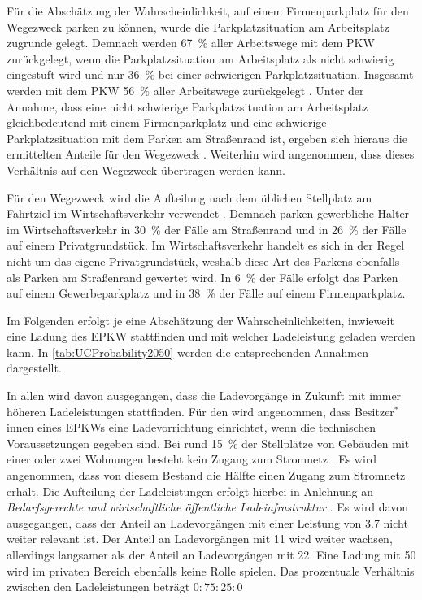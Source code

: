 Für die Abschätzung der Wahrscheinlichkeit, auf einem Firmenparkplatz für den Wegezweck \Arbeit parken zu können, wurde die Parkplatzsituation am Arbeitsplatz zugrunde gelegt.
Demnach werden \SI{67}{\percent} aller Arbeitswege mit dem \gls{PKW} zurückgelegt, wenn die Parkplatzsituation am Arbeitsplatz als nicht schwierig eingestuft wird und nur \SI{36}{\percent} bei einer schwierigen Parkplatzsituation.
Insgesamt werden mit dem \gls{PKW} \SI{56}{\percent} aller Arbeitswege zurückgelegt \cite{Ecke2020}.
Unter der Annahme, dass eine nicht schwierige Parkplatzsituation am Arbeitsplatz gleichbedeutend mit einem Firmenparkplatz und eine schwierige Parkplatzsituation mit dem Parken am Straßenrand ist, ergeben sich hieraus die ermittelten Anteile für den Wegezweck \Arbeitdot.
Weiterhin wird angenommen, dass dieses Verhältnis auf den Wegezweck \Ausbildung übertragen werden kann.\medskip

Für den Wegezweck \dienst wird die Aufteilung nach dem üblichen Stellplatz am Fahrtziel im Wirtschaftsverkehr verwendet \cite{Rikus2015}.
Demnach parken gewerbliche Halter im Wirtschaftsverkehr in \SI{30}{\percent} der Fälle am Straßenrand und in \SI{26}{\percent} der Fälle auf einem Privatgrundstück.
Im Wirtschaftsverkehr handelt es sich in der Regel nicht um das eigene Privatgrundstück, weshalb diese Art des Parkens ebenfalls als Parken am Straßenrand gewertet wird.
In \SI{6}{\percent} der Fälle erfolgt das Parken auf einem Gewerbeparkplatz und in \SI{38}{\percent} der Fälle auf einem Firmenparkplatz.\medskip

Im Folgenden erfolgt je \UC eine Abschätzung der Wahrscheinlichkeiten, inwieweit eine Ladung des \gls{EPKW} stattfinden und mit welcher Ladeleistung geladen werden kann.
In \autoref{tab:UCProbability2050} werden die entsprechenden Annahmen dargestellt.



In allen \UCs wird davon ausgegangen, dass die Ladevorgänge in Zukunft mit immer höheren Ladeleistungen stattfinden.
Für den \UC \Eigenheim wird angenommen, dass Besitzer\(^*\)innen eines \glspl{EPKW} eine Ladevorrichtung einrichtet, wenn die technischen Voraussetzungen gegeben sind.
Bei rund \SI{15}{\percent} der Stellplätze von Gebäuden mit einer oder zwei Wohnungen besteht kein Zugang zum Stromnetz \cite{dena2020}.
Es wird angenommen, dass von diesem Bestand die Hälfte einen Zugang zum Stromnetz erhält.
Die Aufteilung der Ladeleistungen erfolgt hierbei in Anlehnung an \textit{Bedarfsgerechte und wirtschaftliche öffentliche Ladeinfrastruktur} \cite{NPZMAVE2020}.
Es wird davon ausgegangen, dass der Anteil an Ladevorgängen mit einer Leistung von \SI{3.7}{\kw} nicht weiter relevant ist.
Der Anteil an Ladevorgängen mit \SI{11}{\kw} wird weiter wachsen, allerdings langsamer als der Anteil an Ladevorgängen mit \SI{22}{\kw}.
Eine Ladung mit \SI{50}{\kw} wird im privaten Bereich ebenfalls keine Rolle spielen.
Das prozentuale Verhältnis zwischen den Ladeleistungen beträgt \(0:75:25:0\)\medskip

